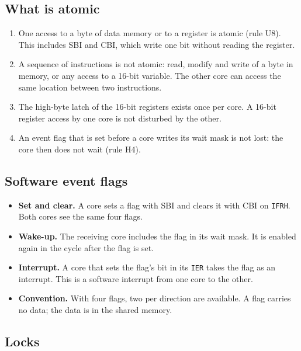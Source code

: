 \documentclass[10pt,a4paper]{article}
\newcommand{\reg}[1]{\texttt{#1}}
\begin{document}
\subsection{What is atomic}

\begin{enumerate}[label=\textbf{C\arabic*},leftmargin=2.6em]
\item One access to a byte of data memory or to a register is atomic (rule U8). This includes SBI and CBI, which
write one bit without reading the register.
\item A sequence of instructions is not atomic: read, modify and write of a byte in memory, or any access to a
16-bit variable. The other core can access the same location between two instructions.
\item The high-byte latch of the 16-bit registers exists once per core. A 16-bit register access by one core is
not disturbed by the other.
\item An event flag that is set before a core writes its wait mask is not lost: the core then does not wait
(rule H4).
\end{enumerate}

\subsection{Software event flags}

\begin{itemize}
\item \textbf{Set and clear.} A core sets a flag with SBI and clears it with CBI on \reg{IFRH}. Both cores see
the same four flags.
\item \textbf{Wake-up.} The receiving core includes the flag in its wait mask. It is enabled again in the cycle
after the flag is set.
\item \textbf{Interrupt.} A core that sets the flag's bit in its \reg{IER} takes the flag as an interrupt. This
is a software interrupt from one core to the other.
\item \textbf{Convention.} With four flags, two per direction are available. A flag carries no data; the data is
in the shared memory.
\end{itemize}

\subsection{Locks}
\end{document}
